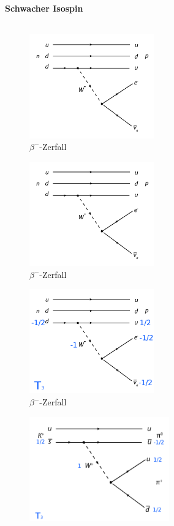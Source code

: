\begin{iframe}
	\framesubtitle{Schwacher Isospin}
	\begin{columns}
		\begin{column}{0.48\textwidth}

			\begin{overprint}
				\begin{figure}\includegraphics[height=4.5cm]{img/betadecay_old}\caption*{$\beta^-$-Zerfall\cite{beta}}\end{figure}
				\begin{figure}\includegraphics[height=4.5cm]{img/betadecay_old}
\caption*{$\beta^-$-Zerfall\cite{beta}}\end{figure}
				\begin{figure}\includegraphics[height=4.5cm]{img/betadecay}
\caption*{$\beta^-$-Zerfall\cite{beta}}\end{figure}
				\begin{figure}\includegraphics[height=4.5cm]{img/kaondecay}

\end{figure}
\end{overprint}
\end{column}
\end{columns}
\end{iframe}
